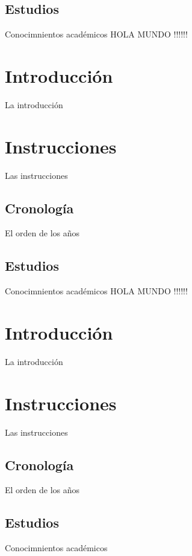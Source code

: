 \documentclass[30pt,a4paper]{article}
\begin{document}
    \subsection{Estudios}
      Conocimnientos académicos  HOLA MUNDO !!!!!! 
  \section{Introducción}
    La introducción
  \section{Instrucciones}
    Las instrucciones
    \subsection{Cronología}
      El orden de los años
    \subsection{Estudios}
      Conocimnientos académicos  HOLA MUNDO !!!!!! 
  \section{Introducción}
    La introducción
  \section{Instrucciones}
    Las instrucciones
    \subsection{Cronología}
      El orden de los años
    \subsection{Estudios}
      Conocimnientos académicos
\end{document}

